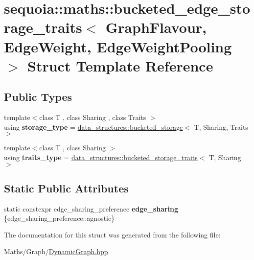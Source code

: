 \hypertarget{structsequoia_1_1maths_1_1bucketed__edge__storage__traits}{}\section{sequoia\+::maths\+::bucketed\+\_\+edge\+\_\+storage\+\_\+traits$<$ Graph\+Flavour, Edge\+Weight, Edge\+Weight\+Pooling $>$ Struct Template Reference}
\label{structsequoia_1_1maths_1_1bucketed__edge__storage__traits}
\subsection*{Public Types}
\begin{DoxyCompactItemize}
\item 
\mbox{\label{structsequoia_1_1maths_1_1bucketed__edge__storage__traits_af04cb56d088b18b63d59e3b33fd4c319}} 
{\footnotesize template$<$class T , class Sharing , class Traits $>$ }\\using {\bfseries storage\+\_\+type} = \mbox{\hyperlink{classsequoia_1_1data__structures_1_1bucketed__storage}{data\+\_\+structures\+::bucketed\+\_\+storage}}$<$ T, Sharing, Traits $>$
\item 
\mbox{\label{structsequoia_1_1maths_1_1bucketed__edge__storage__traits_accf2a3caa986b538d094c5aabd8a280a}} 
{\footnotesize template$<$class T , class Sharing $>$ }\\using {\bfseries traits\+\_\+type} = \mbox{\hyperlink{structsequoia_1_1data__structures_1_1bucketed__storage__traits}{data\+\_\+structures\+::bucketed\+\_\+storage\+\_\+traits}}$<$ T, Sharing $>$
\end{DoxyCompactItemize}
\subsection*{Static Public Attributes}
\begin{DoxyCompactItemize}
\item 
\mbox{\label{structsequoia_1_1maths_1_1bucketed__edge__storage__traits_a1adc45411f3f84d1034dfec464a4e3ca}} 
static constexpr edge\+\_\+sharing\+\_\+preference {\bfseries edge\+\_\+sharing} \{edge\+\_\+sharing\+\_\+preference\+::agnostic\}
\end{DoxyCompactItemize}


The documentation for this struct was generated from the following file\+:\begin{DoxyCompactItemize}
\item 
Maths/\+Graph/\mbox{\hyperlink{_dynamic_graph_8hpp}{Dynamic\+Graph.\+hpp}}\end{DoxyCompactItemize}
